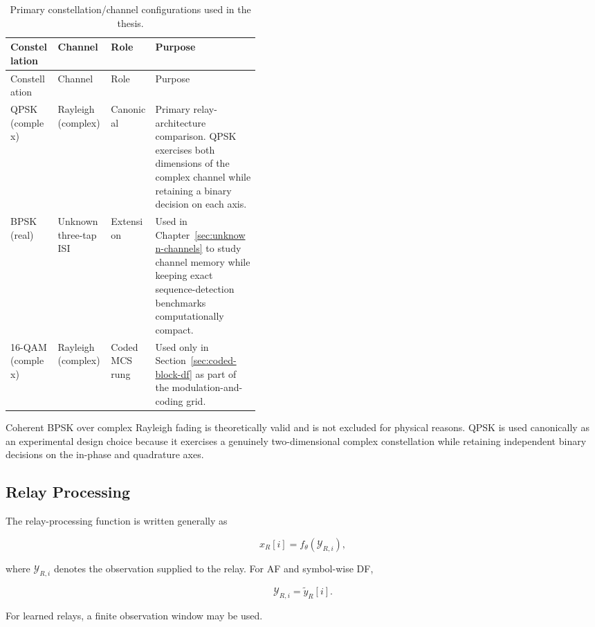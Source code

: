 \begin{longtable}[]{@{}lllp{0.42\linewidth}@{}}
\caption[The evaluated configurations]
{Primary constellation/channel configurations used in the thesis.}
\label{tbl:configurations}\tabularnewline
\toprule
Constellation & Channel & Role & Purpose \\
\midrule
\endfirsthead

\toprule
Constellation & Channel & Role & Purpose \\
\midrule
\endhead

\bottomrule
\endlastfoot

QPSK (complex)
&
Rayleigh (complex)
&
Canonical
&
Primary relay-architecture comparison. QPSK exercises both dimensions
of the complex channel while retaining a binary decision on each axis.
\\

BPSK (real)
&
Unknown three-tap ISI
&
Extension
&
Used in Chapter~\ref{sec:unknown-channels} to study channel memory while
keeping exact sequence-detection benchmarks computationally compact.
\\

16-QAM (complex)
&
Rayleigh (complex)
&
Coded MCS rung
&
Used only in Section~\ref{sec:coded-block-df} as part of the
modulation-and-coding grid.
\\

\end{longtable}

Coherent BPSK over complex Rayleigh fading is theoretically valid and
is not excluded for physical reasons. QPSK is used canonically as an
experimental design choice because it exercises a genuinely
two-dimensional complex constellation while retaining independent
binary decisions on the in-phase and quadrature axes.


\subsection{Relay Processing}\label{sec:relay-processing-methods}

The relay-processing function is written generally as

\[
x_R[i]
=
f_\theta(\mathcal{Y}_{R,i}),
\]

where $\mathcal{Y}_{R,i}$ denotes the observation supplied to the relay.
For AF and symbol-wise DF,

\[
\mathcal{Y}_{R,i}=\tilde y_R[i].
\]

For learned relays, a finite observation window may be used.

